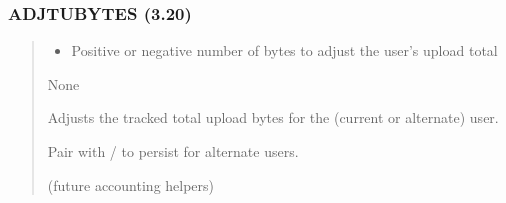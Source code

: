 \documentclass[letterpaper,10pt,english]{sphinxmanual}
\begin{document}
\subsubsection{ADJTUBYTES (3.20)}
\label{\detokenize{ppl:adjtubytes-3-20}}\begin{quote}

\sphinxAtStartPar
{}
\begin{description}
\begin{itemize}
\item {} 
\sphinxAtStartPar
{} \textendash{} Positive or negative number of bytes to adjust the user’s upload total

\end{itemize}

\sphinxAtStartPar
None

\sphinxAtStartPar
Adjusts the tracked total upload bytes for the (current or alternate) user.

\end{description}

\sphinxAtStartPar
{}
\begin{quote}

\begin{sphinxVerbatim}[commandchars=\\\{\}]
 
 
\end{sphinxVerbatim}
\end{quote}
\begin{description}
\sphinxAtStartPar
Pair with  /  to persist for alternate users.

\sphinxAtStartPar
(future accounting helpers)

\end{description}
\end{quote}
\end{document}
